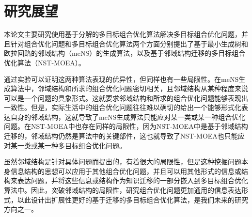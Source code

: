 \section{研究展望}
\label{sec:future}
本论文主要研究使用基于分解的多目标组合优化算法解决多目标组合优化问题，并且针对组合优化问题和多目标组合优化算法两个方面分别提出了基于最小生成树和欧拉回路的邻域结构（meNS）的生成算法，以及基于邻域结构迁移的多目标组合优化算法（NST-MOEA）。
\par
通过实验可以证明这两种算法表现的优异性，但同样也有一些局限性。在meNS生成算法中，邻域结构和所求的组合优化问题密切相关，且邻域结构从某种程度来说可以是一个问题的具象形式。这就要求邻域结构和所求的组合优化问题能够表现出一致性。但是，实际生活中的组合优化问题往往难以确切的给出一个能够形式化表达自身的邻域结构，这就导致了meNS生成算法只能应对某一类或某一种组合优化问题。在NST-MOEA中也存在同样的局限性，因为NST-MOEA中是基于邻域结构迁移的，邻域结构仍然是算法中的关键部件，这也就导致了NST-MOEA也只能应对某一类或某一种多目标组合优化问题。
\par
虽然邻域结构是针对具体问题而提出的，有着很大的局限性，但是这种挖掘问题本身信息结构的思想可以应用于其他组合优化问题，并且可以用其他形式的信息或结构来表达问题，并将这些信息或结构作为知识迁移的一部分嵌入到多目标组合优化算法中。因此，突破邻域结构的局限性，研究组合优化问题更加通用的信息表达形式，以此设计出扩展性更好的基于迁移的多目标组合优化算法，是我们未来的研究方向之一。